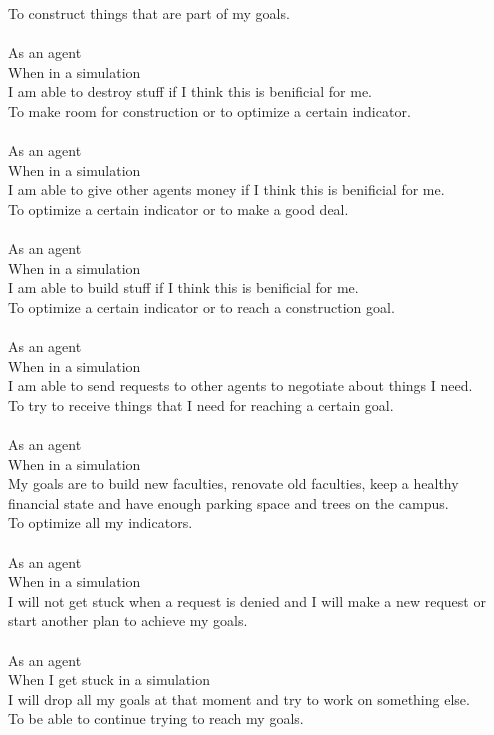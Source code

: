 To construct things that are part of my goals.\\
\\
As an agent\\
When in a simulation\\
I am able to destroy stuff if I think this is benificial for me.\\
To make room for construction or to optimize a certain indicator.\\
\\
As an agent\\
When in a simulation\\
I am able to give other agents money if I think this is benificial for me.\\
To optimize a certain indicator or to make a good deal.\\
\\
As an agent\\
When in a simulation\\
I am able to build stuff if I think this is benificial for me.\\
To optimize a certain indicator or to reach a construction goal.\\
\\
As an agent\\
When in a simulation\\
I am able to send requests to other agents to negotiate about things I need.\\
To try to receive things that I need for reaching a certain goal.\\
\\
As an agent\\
When in a simulation\\
My goals are to build new faculties, renovate old faculties, keep a healthy financial state and have enough parking space and trees on the campus.\\
To optimize all my indicators.\\
\\
As an agent\\
When in a simulation\\
I will not get stuck when a request is denied and I will make a new request or start another plan to achieve my goals.\\
\\
As an agent\\
When I get stuck in a simulation\\
I will drop all my goals at that moment and try to work on something else.\\
To be able to continue trying to reach my goals.


